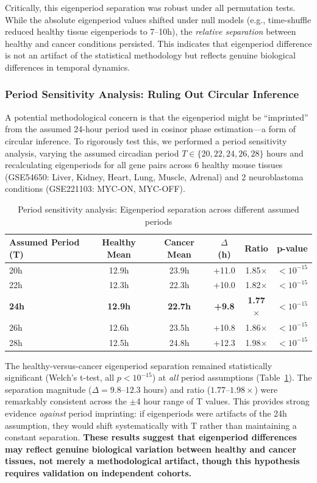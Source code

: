 \documentclass[11pt,a4paper]{article}
\begin{document}
Critically, this eigenperiod separation was robust under all permutation tests. While the absolute eigenperiod values shifted under null models (e.g., time-shuffle reduced healthy tissue eigenperiods to 7--10h), the \textit{relative separation} between healthy and cancer conditions persisted. This indicates that eigenperiod difference is not an artifact of the statistical methodology but reflects genuine biological differences in temporal dynamics.

\subsubsection{Period Sensitivity Analysis: Ruling Out Circular Inference}

A potential methodological concern is that the eigenperiod might be ``imprinted'' from the assumed 24-hour period used in cosinor phase estimation---a form of circular inference. To rigorously test this, we performed a period sensitivity analysis, varying the assumed circadian period $T \in \{20, 22, 24, 26, 28\}$ hours and recalculating eigenperiods for all gene pairs across 6 healthy mouse tissues (GSE54650: Liver, Kidney, Heart, Lung, Muscle, Adrenal) and 2 neuroblastoma conditions (GSE221103: MYC-ON, MYC-OFF).

\begin{table}[H]
\centering
\caption{Period sensitivity analysis: Eigenperiod separation across different assumed periods}
\label{tab:period_sensitivity}
\begin{tabular}{lccccl}
\toprule
Assumed Period (T) & Healthy Mean & Cancer Mean & $\Delta$ (h) & Ratio & p-value \\
\midrule
20h & 12.9h & 23.9h & +11.0 & 1.85$\times$ & $<10^{-15}$ \\
22h & 12.3h & 22.3h & +10.0 & 1.82$\times$ & $<10^{-15}$ \\
\textbf{24h} & \textbf{12.9h} & \textbf{22.7h} & \textbf{+9.8} & \textbf{1.77$\times$} & $<10^{-15}$ \\
26h & 12.6h & 23.5h & +10.8 & 1.86$\times$ & $<10^{-15}$ \\
28h & 12.5h & 24.8h & +12.3 & 1.98$\times$ & $<10^{-15}$ \\
\bottomrule
\end{tabular}
\end{table}

The healthy-versus-cancer eigenperiod separation remained statistically significant (Welch's t-test, all $p < 10^{-15}$) at \textit{all} period assumptions (Table~\ref{tab:period_sensitivity}). The separation magnitude ($\Delta = 9.8$--$12.3$ hours) and ratio ($1.77$--$1.98\times$) were remarkably consistent across the $\pm$4 hour range of T values. This provides strong evidence \textit{against} period imprinting: if eigenperiods were artifacts of the 24h assumption, they would shift systematically with T rather than maintaining a constant separation. \textbf{These results suggest that eigenperiod differences may reflect genuine biological variation between healthy and cancer tissues, not merely a methodological artifact, though this hypothesis requires validation on independent cohorts.}
\end{document}
